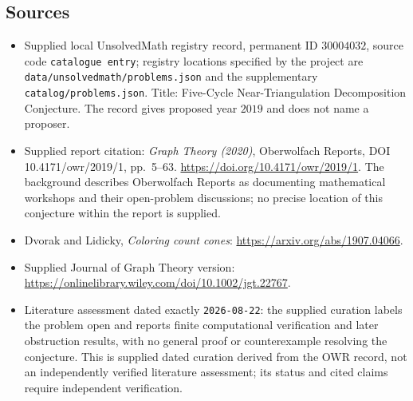 \documentclass[11pt]{article}
\begin{document}
\subsection{Sources}
\begin{itemize}
\item Supplied local UnsolvedMath registry record, permanent ID \(30004032\), source code \texttt{catalogue entry}; registry locations specified by the project are \texttt{data/unsolvedmath/problems.json} and the supplementary \texttt{catalog/problems.json}. Title: Five-Cycle Near-Triangulation Decomposition Conjecture. The record gives proposed year \(2019\) and does not name a proposer.
\item Supplied report citation: \emph{Graph Theory (2020)}, Oberwolfach Reports, DOI 10.4171/owr/2019/1, pp.\ 5--63. \url{https://doi.org/10.4171/owr/2019/1}. The background describes Oberwolfach Reports as documenting mathematical workshops and their open-problem discussions; no precise location of this conjecture within the report is supplied.
\item Dvorak and Lidicky, \emph{Coloring count cones}: \url{https://arxiv.org/abs/1907.04066}.
\item Supplied Journal of Graph Theory version: \url{https://onlinelibrary.wiley.com/doi/10.1002/jgt.22767}.
\item Literature assessment dated exactly \texttt{2026-08-22}: the supplied curation labels the problem open and reports finite computational verification and later obstruction results, with no general proof or counterexample resolving the conjecture. This is supplied dated curation derived from the OWR record, not an independently verified literature assessment; its status and cited claims require independent verification.
\end{itemize}
\end{document}

